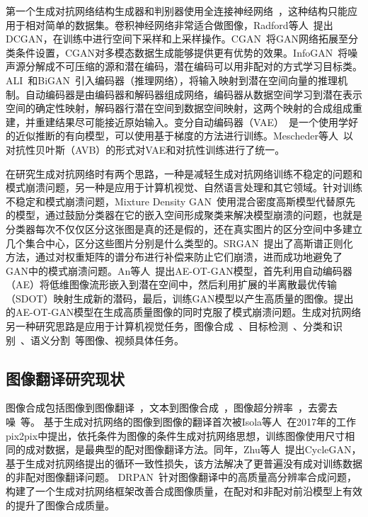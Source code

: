 第一个生成对抗网络结构生成器和判别器使用全连接神经网络~\cite{goodfellow2014generative}，这种结构只能应用于相对简单的数据集。卷积神经网络非常适合做图像，Radford等人~\cite{radford2015unsupervised}提出DCGAN，在训练中进行空间下采样和上采样操作。CGAN~\cite{mirza2014conditional}将GAN网络拓展至分类条件设置，CGAN对多模态数据生成能够提供更有优势的效果。InfoGAN~\cite{chen2016infogan}将噪声源分解成不可压缩的源和潜在编码，潜在编码可以用非配对的方式学习目标类。ALI~\cite{donahue2016adversarial}和BiGAN~\cite{zhang2018bidirectional}引入编码器（推理网络），将输入映射到潜在空间向量的推理机制。自动编码器是由编码器和解码器组成网络，编码器从数据空间学习到潜在表示空间的确定性映射，解码器行潜在空间到数据空间映射，这两个映射的合成组成重建，并重建结果尽可能接近原始输入。变分自动编码器（VAE）~\cite{kingma2013auto}是一个使用学好的近似推断的有向模型，可以使用基于梯度的方法进行训练。Mescheder等人~\cite{mescheder2017adversarial}以对抗性贝叶斯（AVB）的形式对VAE和对抗性训练进行了统一。

在研究生成对抗网络时有两个思路，一种是减轻生成对抗网络训练不稳定的问题和模式崩溃问题，另一种是应用于计算机视觉、自然语言处理和其它领域。针对训练不稳定和模式崩溃问题，Mixture Density GAN~\cite{eghbal2019mixture}使用混合密度高斯模型代替原先的模型，通过鼓励分类器在它的嵌入空间形成聚类来解决模型崩溃的问题，也就是分类器每次不仅仅区分这张图是真的还是假的，还在真实图片的区分空间中多建立几个集合中心，区分这些图片分别是什么类型的。SRGAN~\cite{liu2019spectral}提出了高斯谱正则化方法，通过对权重矩阵的谱分布进行补偿来防止它们崩溃，进而成功地避免了GAN中的模式崩溃问题。An等人~\cite{an2020ae}提出AE-OT-GAN模型，首先利用自动编码器（AE）将低维图像流形嵌入到潜在空间中，然后利用扩展的半离散最优传输（SDOT）映射生成新的潜码，最后，训练GAN模型以产生高质量的图像。提出的AE-OT-GAN模型在生成高质量图像的同时克服了模式崩溃问题。生成对抗网络另一种研究思路是应用于计算机视觉任务，图像合成~\cite{wang2019discriminative}、目标检测~\cite{wang2017fast}、分类和识别~\cite{oza2020multiple,fang2020generate,jung2020icaps}、语义分割~\cite{luc2016semantic}等图像、视频具体任务。

\subsection{图像翻译研究现状}

图像合成包括图像到图像翻译~\cite{isola2017image}，文本到图像合成~\cite{zhu2019dm}，图像超分辨率~\cite{hyun2020varsr,lee2020journey}，去雾去噪~\cite{shao2020domain,wan2020reflection}等。
基于生成对抗网络的图像到图像的翻译首次被Isola等人~\cite{isola2017image}在2017年的工作pix2pix中提出，依托条件为图像的条件生成对抗网络思想，训练图像使用尺寸相同的成对数据，是最典型的配对图像翻译方法。同年，Zhu等人~\cite{zhu2017unpaired}提出CycleGAN，基于生成对抗网络提出的循环一致性损失，该方法解决了更普遍没有成对训练数据的非配对图像翻译问题。
DRPAN~\cite{wang2019discriminative}针对图像翻译中的高质量高分辨率合成问题，构建了一个生成对抗网络框架改善合成图像质量，在配对和非配对前沿模型上有效的提升了图像合成质量。

